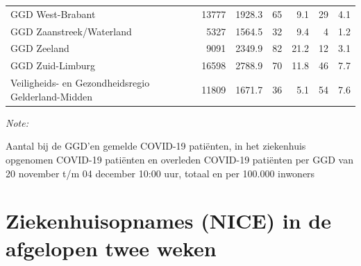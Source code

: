 \documentclass[
  english,
  man,floatsintext]{apa6}
\begin{document}
\begin{table}
\begin{threeparttable}
\begin{tabular}{lrrrrrr}
GGD West-Brabant & 13777 & 1928.3 & 65 & 9.1 & 29 & 4.1\\
GGD Zaanstreek/Waterland & 5327 & 1564.5 & 32 & 9.4 & 4 & 1.2\\
GGD Zeeland & 9091 & 2349.9 & 82 & 21.2 & 12 & 3.1\\
GGD Zuid-Limburg & 16598 & 2788.9 & 70 & 11.8 & 46 & 7.7\\
Veiligheids- en Gezondheidsregio Gelderland-Midden & 11809 & 1671.7 & 36 & 5.1 & 54 & 7.6\\
\bottomrule
\end{tabular}
\begin{tablenotes}
\item \textit{Note: } 
\item Aantal bij de GGD’en gemelde COVID-19 patiënten, in het ziekenhuis opgenomen COVID-19 patiënten en overleden COVID-19 patiënten per GGD van 20 november t/m 04 december 10:00 uur, totaal en per 100.000 inwoners
\end{tablenotes}
\end{threeparttable}
\endgroup{}
\end{table}

\newpage

\hypertarget{ziekenhuisopnames-nice-in-de-afgelopen-twee-weken}{%
\section{Ziekenhuisopnames (NICE) in de afgelopen twee weken}\label{ziekenhuisopnames-nice-in-de-afgelopen-twee-weken}}
\end{document}
